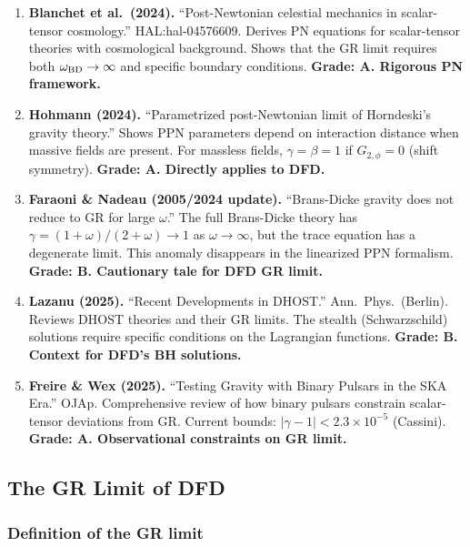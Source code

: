 \documentclass[11pt,a4paper]{article}
\begin{document}
\begin{enumerate}
\item \textbf{Blanchet et al.\ (2024).} ``Post-Newtonian celestial mechanics in scalar-tensor cosmology.'' HAL:hal-04576609. Derives PN equations for scalar-tensor theories with cosmological background. Shows that the GR limit requires both $\omega_{\rm BD} \to \infty$ and specific boundary conditions. \textbf{Grade: A. Rigorous PN framework.}

\item \textbf{Hohmann (2024).} ``Parametrized post-Newtonian limit of Horndeski's gravity theory.'' Shows PPN parameters depend on interaction distance when massive fields are present. For massless fields, $\gamma = \beta = 1$ if $G_{2,\phi} = 0$ (shift symmetry). \textbf{Grade: A. Directly applies to DFD.}

\item \textbf{Faraoni \& Nadeau (2005/2024 update).} ``Brans-Dicke gravity does not reduce to GR for large $\omega$.'' The full Brans-Dicke theory has $\gamma = (1+\omega)/(2+\omega) \to 1$ as $\omega \to \infty$, but the trace equation has a degenerate limit. This anomaly disappears in the linearized PPN formalism. \textbf{Grade: B. Cautionary tale for DFD GR limit.}

\item \textbf{Lazanu (2025).} ``Recent Developments in DHOST.'' Ann.\ Phys.\ (Berlin). Reviews DHOST theories and their GR limits. The stealth (Schwarzschild) solutions require specific conditions on the Lagrangian functions. \textbf{Grade: B. Context for DFD's BH solutions.}

\item \textbf{Freire \& Wex (2025).} ``Testing Gravity with Binary Pulsars in the SKA Era.'' OJAp. Comprehensive review of how binary pulsars constrain scalar-tensor deviations from GR. Current bounds: $|\gamma - 1| < 2.3 \times 10^{-5}$ (Cassini). \textbf{Grade: A. Observational constraints on GR limit.}
\end{enumerate}

\subsection{The GR Limit of DFD}

\subsubsection{Definition of the GR limit}
\end{document}
